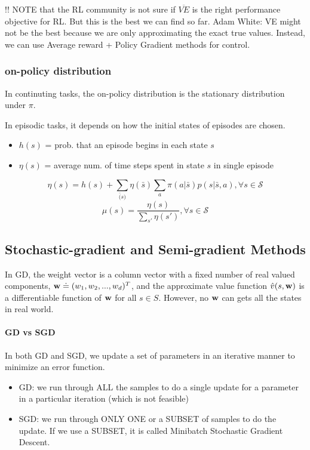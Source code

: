\documentclass[sutton_barto_notes.tex]{subfiles}
\begin{document}
!! NOTE that the RL community is not sure if $\overline{VE}$ is the right performance objective for RL. But this is the best we can find so far. Adam White: VE might not be the best because we are only approximating the exact true values. Instead, we can use Average reward + Policy Gradient methods for control.

\subsubsection{on-policy distribution}

In continuting tasks, the on-policy distribution is the stationary distribution under $\pi$.

In episodic tasks, it depends on how the initial states of episodes are chosen.
\begin{itemize}
\item $h(s)$ = prob. that an episode begins in each state $s$
\item $\eta(s)$ = average num. of time steps spent in state $s$ in single episode
\end{itemize}
$$ \eta(s) = h(s) + \sum_{\bar(s)} \eta(\bar{s}) \sum_a \pi(a| \bar{s}) p(s| \bar{s}, a), \forall s \in \mathcal{S} $$
$$ \mu(s) = \frac{\eta(s)}{\sum_{s'} \eta(s')}, \forall s \in \mathcal{S} $$

\subsection{Stochastic-gradient and Semi-gradient Methods}

In GD, the weight vector is a column vector with a fixed number of real valued components, ${\operatorname*{\mathbf{w}}} \doteq (w_1, w_2, ..., w_d)^T $, and the approximate value function $\hat{v}(s,{\operatorname*{\mathbf{w}}})$ is a differentiable function of ${\operatorname*{\mathbf{w}}}$ for all $s \in S$. However, no ${\operatorname*{\mathbf{w}}}$ can gets all the states in real world.

\paragraph{GD vs SGD} In both GD and SGD, we update a set of parameters in an iterative manner to minimize an error function.
\begin{itemize}
\item GD: we run through ALL the samples to do a single update for a parameter in a particular iteration (which is not feasible)
\item SGD: we run through ONLY ONE or a SUBSET of samples to do the update. If we use a SUBSET, it is called Minibatch Stochastic Gradient Descent.
\end{itemize}
\end{document}
